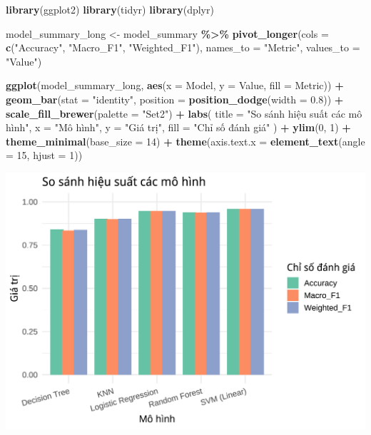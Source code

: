 \documentclass[
]{article}
\newenvironment{Shaded}{\begin{snugshade}}{\end{snugshade}}
\newcommand{\AttributeTok}[1]{\textcolor[rgb]{0.13,0.29,0.53}{#1}}
\newcommand{\DecValTok}[1]{\textcolor[rgb]{0.00,0.00,0.81}{#1}}
\newcommand{\FloatTok}[1]{\textcolor[rgb]{0.00,0.00,0.81}{#1}}
\newcommand{\FunctionTok}[1]{\textcolor[rgb]{0.13,0.29,0.53}{\textbf{#1}}}
\newcommand{\NormalTok}[1]{#1}
\newcommand{\OtherTok}[1]{\textcolor[rgb]{0.56,0.35,0.01}{#1}}
\newcommand{\SpecialCharTok}[1]{\textcolor[rgb]{0.81,0.36,0.00}{\textbf{#1}}}
\newcommand{\StringTok}[1]{\textcolor[rgb]{0.31,0.60,0.02}{#1}}
\begin{document}
\begin{Shaded}
\begin{Highlighting}[]
\FunctionTok{library}\NormalTok{(ggplot2)}
\FunctionTok{library}\NormalTok{(tidyr)}
\FunctionTok{library}\NormalTok{(dplyr)}

\NormalTok{model\_summary\_long }\OtherTok{\textless{}{-}}\NormalTok{ model\_summary }\SpecialCharTok{\%\textgreater{}\%}
  \FunctionTok{pivot\_longer}\NormalTok{(}\AttributeTok{cols =} \FunctionTok{c}\NormalTok{(}\StringTok{"Accuracy"}\NormalTok{, }\StringTok{"Macro\_F1"}\NormalTok{, }\StringTok{"Weighted\_F1"}\NormalTok{),}
               \AttributeTok{names\_to =} \StringTok{"Metric"}\NormalTok{, }\AttributeTok{values\_to =} \StringTok{"Value"}\NormalTok{)}

\FunctionTok{ggplot}\NormalTok{(model\_summary\_long, }\FunctionTok{aes}\NormalTok{(}\AttributeTok{x =}\NormalTok{ Model, }\AttributeTok{y =}\NormalTok{ Value, }\AttributeTok{fill =}\NormalTok{ Metric)) }\SpecialCharTok{+}
  \FunctionTok{geom\_bar}\NormalTok{(}\AttributeTok{stat =} \StringTok{"identity"}\NormalTok{, }\AttributeTok{position =} \FunctionTok{position\_dodge}\NormalTok{(}\AttributeTok{width =} \FloatTok{0.8}\NormalTok{)) }\SpecialCharTok{+}
  \FunctionTok{scale\_fill\_brewer}\NormalTok{(}\AttributeTok{palette =} \StringTok{"Set2"}\NormalTok{) }\SpecialCharTok{+}
  \FunctionTok{labs}\NormalTok{(}
    \AttributeTok{title =} \StringTok{"So sánh hiệu suất các mô hình"}\NormalTok{,}
    \AttributeTok{x =} \StringTok{"Mô hình"}\NormalTok{,}
    \AttributeTok{y =} \StringTok{"Giá trị"}\NormalTok{,}
    \AttributeTok{fill =} \StringTok{"Chỉ số đánh giá"}
\NormalTok{  ) }\SpecialCharTok{+}
  \FunctionTok{ylim}\NormalTok{(}\DecValTok{0}\NormalTok{, }\DecValTok{1}\NormalTok{) }\SpecialCharTok{+}
  \FunctionTok{theme\_minimal}\NormalTok{(}\AttributeTok{base\_size =} \DecValTok{14}\NormalTok{) }\SpecialCharTok{+}
  \FunctionTok{theme}\NormalTok{(}\AttributeTok{axis.text.x =} \FunctionTok{element\_text}\NormalTok{(}\AttributeTok{angle =} \DecValTok{15}\NormalTok{, }\AttributeTok{hjust =} \DecValTok{1}\NormalTok{))}
\end{Highlighting}
\end{Shaded}

\includegraphics{report_files/figure-latex/unnamed-chunk-29-1.pdf}
\end{document}
